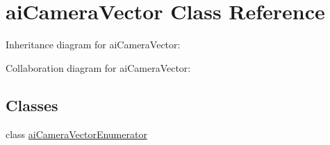\hypertarget{classai_camera_vector}{\section{ai\+Camera\+Vector Class Reference}
\label{classai_camera_vector}
}


Inheritance diagram for ai\+Camera\+Vector\+:


Collaboration diagram for ai\+Camera\+Vector\+:
\subsection*{Classes}
\begin{DoxyCompactItemize}
\item 
class \hyperlink{classai_camera_vector_1_1ai_camera_vector_enumerator}{ai\+Camera\+Vector\+Enumerator}
\end{DoxyCompactItemize}
